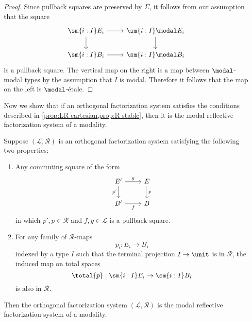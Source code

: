 \documentclass{msc}
\begin{document}
\begin{proof}
  Since pullback squares are preserved by $\Sigma$, it follows from our assumption that the square
  \begin{equation*}
    \begin{tikzcd}
      \sm{i:I}E_i \arrow[r] \arrow[d] & \sm{i:I}\modal E_i \arrow[d] \\
      \sm{i:I}B_i \arrow[r] & \sm{i:I}\modal B_i
    \end{tikzcd}
  \end{equation*}
  is a pullback square. The vertical map on the right is a map between $\modal$-modal types by the assumption that $I$ is modal. Therefore it follows that the map on the left is $\modal$-\'etale.
\end{proof}

Now we show that if an orthogonal factorization system satisfies the conditions described in \cref{prop:LR-cartesian,prop:R-stable}, then it is the modal reflective factorization system of a modality.

\begin{thm}\label{thm:rfs}
  Suppose $(\mathcal{L},\mathcal{R})$ is an orthogonal factorization system satisfying the following two properties:
  \begin{enumerate}
  \item Any commuting square of the form
    \begin{equation*}
      \begin{tikzcd}
        E' \arrow[d,swap,"{p'}"] \arrow[r,"g"] & E \arrow[d,"p"] \\
        B' \arrow[r,swap,"f"] & B
      \end{tikzcd}
    \end{equation*}
    in which $p',p\in\mathcal{R}$ and $f,g\in\mathcal{L}$ is a pullback square.
  \item For any family of $\mathcal{R}$-maps
    \begin{equation*}
      p_i:E_i\to B_i
    \end{equation*}
    indexed by a type $I$ such that the terminal projection $I\to\unit$ is in $\mathcal{R}$, the induced map on total spaces
    \begin{equation*}
      \total{p}:\sm{i:I}E_i\to\sm{i:I}B_i
    \end{equation*}
    is also in $\mathcal{R}$. 
  \end{enumerate}
  Then the orthogonal factorization system $(\mathcal{L},\mathcal{R})$ is the modal reflective factorization system of a modality. 
\end{thm}
\end{document}
